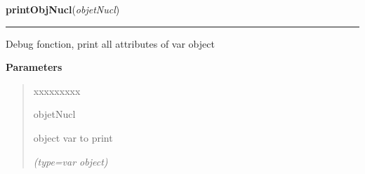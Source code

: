     \vspace{0.5ex}

\hspace{.8\funcindent}\begin{boxedminipage}{\funcwidth}

    \raggedright \textbf{printObjNucl}(\textit{objetNucl})

    \vspace{-1.5ex}

    \rule{\textwidth}{0.5\fboxrule}
\setlength{\parskip}{2ex}
    Debug fonction, print all attributes of var object

\setlength{\parskip}{1ex}
      \textbf{Parameters}
      \vspace{-1ex}

      \begin{quote}
        \begin{Ventry}{xxxxxxxxx}

          \item[objetNucl]

          object var to print

            {\it (type=var object)}

        \end{Ventry}

      \end{quote}

    \end{boxedminipage}

    \label{script-FixedVar:addANN}

    \vspace{0.5ex}

